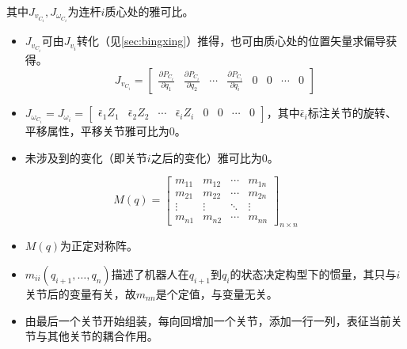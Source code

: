 \documentclass[
12pt, %
a4paper, 
oneside, %
headinclude,footinclude, %
]{scrartcl}
\begin{document}
其中$ J_{v_{C_i}},J_{\omega_{C_i}} $为连杆$ i $质心处的雅可比。
\begin{itemize}
\item $ J_{v_{C_i}} $可由$ J_{v_i} $转化（见\ref{sec:bingxing}）推得，也可由质心处的位置矢量求偏导获得。
$$ J_{v_{C_i}} = \begin{bmatrix} \frac{\partial P_{C_i}}{\partial q_1} & \frac{\partial P_{C_i}}{\partial q_2} & \cdots & \frac{\partial P_{C_i}}{\partial q_i} & 0 & 0 & \cdots & 0 \end{bmatrix} $$
\item $ J_{\omega_{C_i}} = J_{\omega_i} = \begin{bmatrix} \bar{\epsilon}_1 Z_1 & \bar{\epsilon}_2 Z_2 & \cdots & \bar{\epsilon}_i Z_i & 0 & 0 & \cdots & 0 \end{bmatrix} $，其中$ \bar{\epsilon}_i $标注关节的旋转、平移属性，平移关节雅可比为$ 0 $。
\item 未涉及到的变化（即关节$ i $之后的变化）雅可比为$ 0 $。
\end{itemize}

$$
M(q) = \begin{bmatrix}
m_{11} & m_{12} & \cdots & m_{1n} \\
m_{21} & m_{22} & \cdots & m_{2n} \\
\vdots & \vdots & \ddots & \vdots \\
m_{n1} & m_{n2} & \cdots & m_{nn}
\end{bmatrix}_{n \times n}
$$
\begin{itemize}
\item $ M(q) $为正定对称阵。
\item $ m_{ii}(q_{i + 1}, \dots, q_n) $描述了机器人在$ q_{i + 1} $到$ q_i $的状态决定构型下的惯量，其只与$ i $关节后的变量有关，故$ m_{nn} $是个定值，与变量无关。
\item 由最后一个关节开始组装，每向回增加一个关节，添加一行一列，表征当前关节与其他关节的耦合作用。
\end{itemize}
\end{document}
